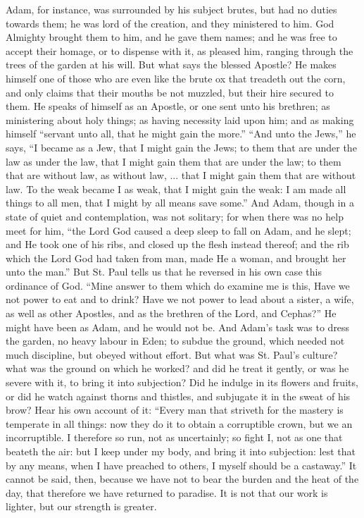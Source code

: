 Adam, for instance, was surrounded by his subject brutes, but had
no duties towards them; he was lord of the creation, and they
ministered to him. God Almighty brought them to him, and he gave them
names; and he was free to accept their homage, or to dispense with it,
as pleased him, ranging through the trees of the garden at his will.
But what says the blessed Apostle? He makes himself one of those who
are even like the brute ox that treadeth out the corn, and only claims
that their mouths be not muzzled, but their hire secured to them. He
speaks of himself as an Apostle, or one sent unto his brethren; as
ministering about holy things; as having necessity laid upon him; and
as making himself ``servant unto all, that he might gain the
more.'' ``And unto the Jews,'' he says, ``I became as
a Jew, that I might gain the Jews; to them that are under the law as
under the law, that I might gain them that are under the law; to them
that are without law, as without law, ... that I might gain them that
are without law. To the weak became I as weak, that I might gain the
weak: I am made all things to all men, that I might by all means save
some.'' And Adam, though in a state of quiet and contemplation,
was not solitary; for when there was no help meet for him, ``the
Lord God caused a deep sleep to fall on Adam, and he slept; and He
took one of his ribs, and closed up the flesh instead thereof; and the
rib which the Lord God had taken from man, made He a woman, and
brought her unto the man.'' But St. Paul tells us that he reversed
in his own case this ordinance of God. ``Mine answer to them which
do examine me is this, Have we not power to eat and to drink? Have we
not power to lead about a sister, a wife, as well as other Apostles,
and as the brethren of the Lord, and Cephas?'' He might have been
as Adam, and he would not be. And Adam's task was to dress the garden,
no heavy labour in Eden; to subdue the ground, which needed not much
discipline, but obeyed without effort. But what was St. Paul's
culture? what was the ground on which he worked? and did he treat it
gently, or was he severe with it, to bring it into subjection? Did he
indulge in its flowers and fruits, or did he watch against thorns and
thistles, and subjugate it in the sweat of his brow? Hear his own
account of it: ``Every man that striveth for the mastery is
temperate in all things: now they do it to obtain a corruptible crown,
but we an incorruptible. I therefore so run, not as uncertainly; so
fight I, not as one that beateth the air: but I keep under my body,
and bring it into subjection: lest that by any means, when I have
preached to others, I myself should be a castaway.'' It cannot be
said, then, because we have not to bear the burden and the heat of the
day, that therefore we have returned to paradise. It is not that our
work is lighter, but our strength is greater.


